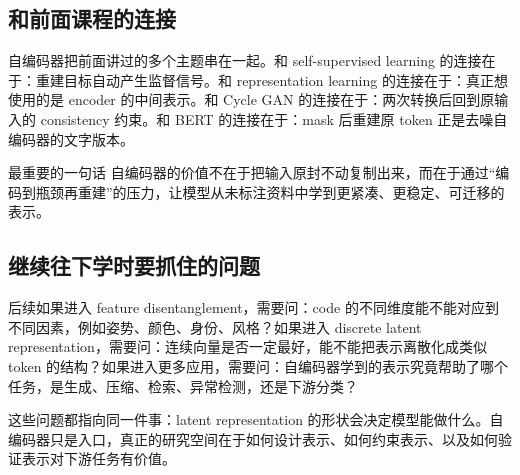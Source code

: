 \documentclass[a4paper]{article}
\begin{document}
\subsection{和前面课程的连接}

自编码器把前面讲过的多个主题串在一起。和 self-supervised learning 的连接在于：重建目标自动产生监督信号。和 representation learning 的连接在于：真正想使用的是 encoder 的中间表示。和 Cycle GAN 的连接在于：两次转换后回到原输入的 consistency 约束。和 BERT 的连接在于：mask 后重建原 token 正是去噪自编码器的文字版本。

\begin{importantbox}{最重要的一句话}
    自编码器的价值不在于把输入原封不动复制出来，而在于通过“编码到瓶颈再重建”的压力，让模型从未标注资料中学到更紧凑、更稳定、可迁移的表示。
\end{importantbox}

\subsection{继续往下学时要抓住的问题}

后续如果进入 feature disentanglement，需要问：code 的不同维度能不能对应到不同因素，例如姿势、颜色、身份、风格？如果进入 discrete latent representation，需要问：连续向量是否一定最好，能不能把表示离散化成类似 token 的结构？如果进入更多应用，需要问：自编码器学到的表示究竟帮助了哪个任务，是生成、压缩、检索、异常检测，还是下游分类？

这些问题都指向同一件事：latent representation 的形状会决定模型能做什么。自编码器只是入口，真正的研究空间在于如何设计表示、如何约束表示、以及如何验证表示对下游任务有价值。
\end{document}
